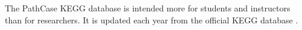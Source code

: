The PathCase KEGG database is intended more for students and instructors than
for researchers. It is updated each year from the official KEGG database
\cite{enzyme-database} \cite{pathcase-basic}.






